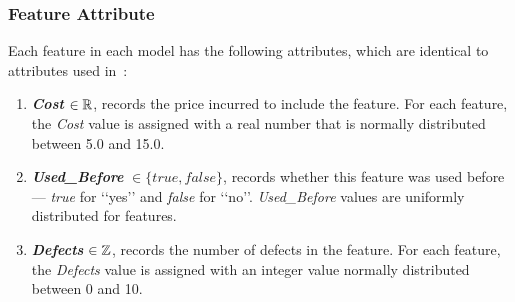
\subsubsection{Feature Attribute}

Each feature in each model has the following attributes, which are identical to attributes used in~\cite{DBLP:conf/icse/SayyadMA13}:

\begin{enumerate}[label=\textbf{\arabic*.},itemindent=*,itemsep=0.1mm]
  \item \textbf{\emph{Cost}}  $\in {\mathbb R}$, records the price incurred to include the feature. For each feature, the \emph{Cost} value is assigned with a real number that is normally distributed between 5.0 and 15.0.
  \item \textbf{\emph{Used\_Before}} $\in \{true, false\}$, records whether this feature was used before --- \emph{true}  for \lq\lq{}yes\rq\rq{} and \emph{false} for \lq\lq{}no\rq\rq. \emph{Used\_Before} values are uniformly distributed for features.
  \item \textbf{\emph{Defects}} $\in {\mathbb Z}$, records the number of defects in the feature. For each feature, the \emph{Defects} value is assigned with an integer value normally distributed between 0 and 10. %
\end{enumerate}


